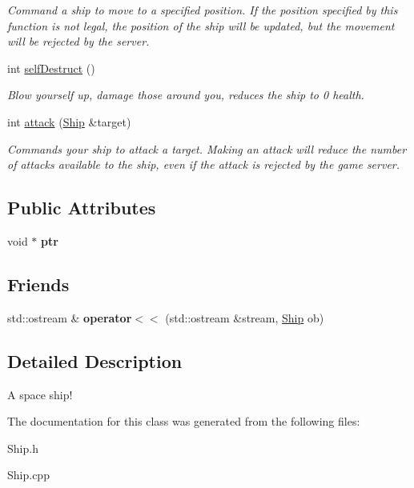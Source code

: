 \begin{DoxyCompactItemize}
\begin{DoxyCompactList}\small\item\em \-Command a ship to move to a specified position. \-If the position specified by this function is not legal, the position of the ship will be updated, but the movement will be rejected by the server. \end{DoxyCompactList}\item 
\hypertarget{classShip_a6923f7ba8f19d8e6ba7a6a85736b57cf}{int \hyperlink{classShip_a6923f7ba8f19d8e6ba7a6a85736b57cf}{self\-Destruct} ()}\label{classShip_a6923f7ba8f19d8e6ba7a6a85736b57cf}

\begin{DoxyCompactList}\small\item\em \-Blow yourself up, damage those around you, reduces the ship to 0 health. \end{DoxyCompactList}\item 
\hypertarget{classShip_a2cf78e622fde55074161b008a69f4b95}{int \hyperlink{classShip_a2cf78e622fde55074161b008a69f4b95}{attack} (\hyperlink{classShip}{\-Ship} \&target)}\label{classShip_a2cf78e622fde55074161b008a69f4b95}

\begin{DoxyCompactList}\small\item\em \-Commands your ship to attack a target. \-Making an attack will reduce the number of attacks available to the ship, even if the attack is rejected by the game server. \end{DoxyCompactList}\end{DoxyCompactItemize}
\subsection*{\-Public \-Attributes}
\begin{DoxyCompactItemize}
\item 
\hypertarget{classShip_afd95bf8e380bb0cae412c457b7d29991}{void $\ast$ {\bfseries ptr}}\label{classShip_afd95bf8e380bb0cae412c457b7d29991}

\end{DoxyCompactItemize}
\subsection*{\-Friends}
\begin{DoxyCompactItemize}
\item 
\hypertarget{classShip_a5ff60a63af13621f282efad7bf4a5dcb}{std\-::ostream \& {\bfseries operator$<$$<$} (std\-::ostream \&stream, \hyperlink{classShip}{\-Ship} ob)}\label{classShip_a5ff60a63af13621f282efad7bf4a5dcb}

\end{DoxyCompactItemize}


\subsection{\-Detailed \-Description}
\-A space ship! 

\-The documentation for this class was generated from the following files\-:\begin{DoxyCompactItemize}
\item 
\-Ship.\-h\item 
\-Ship.\-cpp\end{DoxyCompactItemize}
